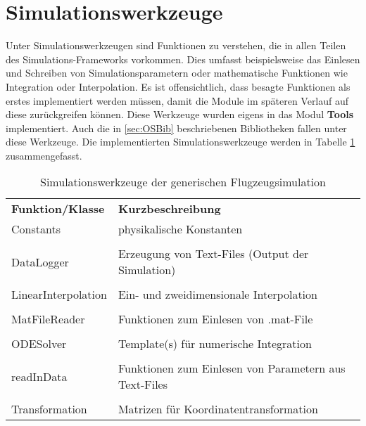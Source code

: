 \section{Simulationswerkzeuge}
Unter Simulationswerkzeugen sind Funktionen zu verstehen, die in allen Teilen des Simulations-Frameworks vorkommen. Dies umfasst beispielsweise das Einlesen und Schreiben von Simulationsparametern oder mathematische Funktionen wie Integration oder Interpolation. Es ist offensichtlich, dass besagte Funktionen als erstes implementiert werden müssen, damit die Module im späteren Verlauf auf diese zurückgreifen können. Diese Werkzeuge wurden eigens in das Modul \textbf{Tools} implementiert. Auch die in \ref{sec:OSBib} beschriebenen Bibliotheken fallen unter diese Werkzeuge. Die implementierten Simulationswerkzeuge werden in Tabelle \ref{tab: SimWerk} zusammengefasst.
\begin{table}[h]
\centering	\begin{tabular}{lp{11cm}}
		\textbf{Funktion/Klasse} & \textbf{Kurzbeschreibung}\\
		 Constants & physikalische Konstanten\\\\
		 DataLogger & Erzeugung von Text-Files (Output der Simulation)\\\\
		 LinearInterpolation & Ein- und zweidimensionale Interpolation \\\\
		 MatFileReader & Funktionen zum Einlesen von .mat-File\\\\
		 ODESolver & Template(s) für numerische Integration\\\\
		 readInData & Funktionen zum Einlesen von Parametern aus Text-Files\\\\
		 Transformation & Matrizen für Koordinatentransformation
	\end{tabular}
\label{tab: SimWerk}
\caption{Simulationswerkzeuge der generischen Flugzeugsimulation}
\end{table}
\newpage
